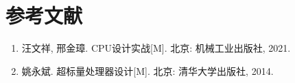 \section{参考文献}

\begin{enumerate}[leftmargin=2em,itemsep=4pt]
  \item 汪文祥, 邢金璋. CPU设计实战[M]. 北京: 机械工业出版社, 2021.
  \item 姚永斌. 超标量处理器设计[M]. 北京: 清华大学出版社, 2014.
\end{enumerate}
